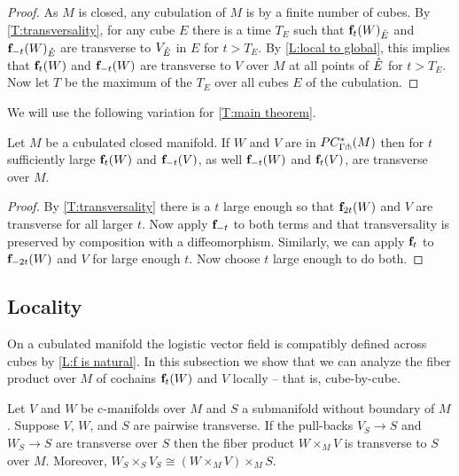 \begin{proof}
	As $M$ is closed, any cubulation of $M$ is by a finite number of cubes.
	By \cref{T:transversality}, for any cube $E$ there is a time $T_E$ such that $\mathbf{f}_t(W)_{\mathring{E}}$ and $\mathbf{f}_{-t}(W)_{\mathring{E}}$ are transverse to $V_{\mathring{E}}$ in $E$ for $t > T_E$.
	By \cref{L:local to global}, this implies that $\mathbf{f}_t(W)$ and $\mathbf{f}_{-t}(W)$ are transverse to $V$ over $M$ at all points of $\mathring{E}$ for $t > T_E$.
	Now let $T$ be the maximum of the $T_E$ over all cubes $E$ of the cubulation.
\end{proof}

We will use the following variation for \cref{T:main theorem}.

\begin{corollary}\label{C:transversality}
	Let $M$ be a cubulated closed manifold.
	If $W$ and $V$ are in $PC_{\Gamma \pitchfork}^*(M)$ then for $t$ sufficiently large $\mathbf{f}_t(W)$ and $\mathbf{f}_{-t}(V)$, as well $\mathbf{f}_{-t}(W)$ and $\mathbf{f}_t(V)$, are transverse over $M$.
\end{corollary}

\begin{proof}
	By \cref{T:transversality} there is a $t$ large enough so that $\mathbf{f}_{2t}(W)$ and $V$ are transverse for all larger $t$.
	Now apply $\mathbf{f}_{-t}$ to both terms and that transversality is preserved by composition with a diffeomorphism.
	Similarly, we can apply $\mathbf{f}_t$ to $\mathbf{f}_{-2t}(W)$ and $V$ for large enough $t$.
	Now choose $t$ large enough to do both.
\end{proof}

\subsection{Locality}\label{S: locality}

On a cubulated manifold the logistic vector field is compatibly defined across cubes by \cref{L:f is natural}.
In this subsection we show that we can analyze the fiber product over $M$ of cochains $\mathbf{f}_t(W)$ and $V$ locally -- that is, cube-by-cube.

\begin{lemma}\label{L:little trans lemma}
	Let $V$ and $W$ be c-manifolds over $M$ and $S$ a submanifold without boundary of $M$.
	Suppose $V$, $W$, and $S$ are pairwise transverse.
	If the pull-backs $V_S \to S$ and $W_S \to S$ are transverse over $S$ then the fiber product $W \times_M V$ is transverse to $S$ over $M$.
	Moreover, $W_S \times_S V_S \cong (W \times_M V) \times_M S$.
\end{lemma}

